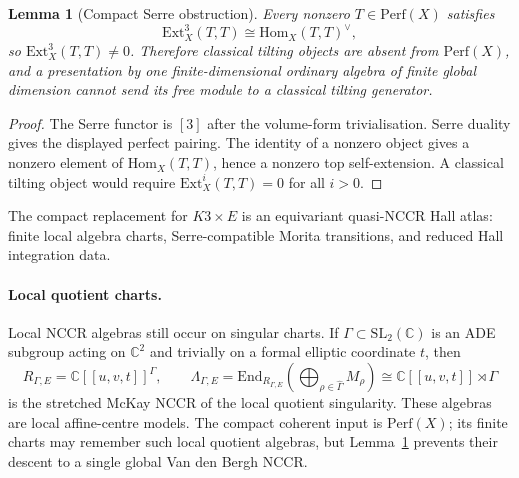 \documentclass[11pt]{article}
\providecommand{\bC}{\mathbb{C}}
\providecommand{\End}{\mathrm{End}}
\providecommand{\Hom}{\mathrm{Hom}}
\providecommand{\Ext}{\mathrm{Ext}}
\providecommand{\NCCR}{\mathrm{NCCR}}
\providecommand{\Perf}{\mathrm{Perf}}
\theoremstyle{plain}
\newtheorem{lemma}[theorem]{Lemma}
\theoremstyle{definition}
\begin{document}
\begin{lemma}[Compact Serre obstruction]
\label{lem:compact-serre-obstruction}
Every nonzero \(T\in \Perf(X)\) satisfies
\[
  \Ext^3_X(T,T)\cong\Hom_X(T,T)^\vee ,
\]
so \(\Ext^3_X(T,T)\neq0\). Therefore classical tilting objects are
absent from \(\Perf(X)\), and a presentation by one finite-dimensional
ordinary algebra of finite global dimension cannot send its free module
to a classical tilting generator.
\end{lemma}

\begin{proof}
The Serre functor is \([3]\) after the volume-form trivialisation.
Serre duality gives the displayed perfect pairing. The identity of a
nonzero object gives a nonzero element of \(\Hom_X(T,T)\), hence a
nonzero top self-extension. A classical tilting object would require
\(\Ext^i_X(T,T)=0\) for all \(i>0\).
\end{proof}

The compact replacement for \(K3\times E\) is an equivariant
quasi-\(\NCCR\) Hall atlas: finite local algebra charts,
Serre-compatible Morita transitions, and reduced Hall integration data.

\paragraph*{Local quotient charts.}
Local \(\NCCR\) algebras still occur on singular charts. If
\(\Gamma\subset\mathrm{SL}_2(\bC)\) is an ADE subgroup acting on
\(\bC^2\) and trivially on a formal elliptic coordinate \(t\), then
\[
  R_{\Gamma,E}=\bC[[u,v,t]]^\Gamma,\qquad
  \Lambda_{\Gamma,E}
  =
  \End_{R_{\Gamma,E}}\!\left(\bigoplus_{\rho\in\widehat\Gamma}M_\rho\right)
  \cong
  \bC[[u,v,t]]\rtimes\Gamma
\]
is the stretched McKay \(\NCCR\) of the local quotient singularity.
These algebras are local affine-centre models. The compact coherent
input is \(\Perf(X)\); its finite charts may remember such local
quotient algebras, but Lemma~\ref{lem:compact-serre-obstruction}
prevents their descent to a single global Van den Bergh \(\NCCR\).
\end{document}
